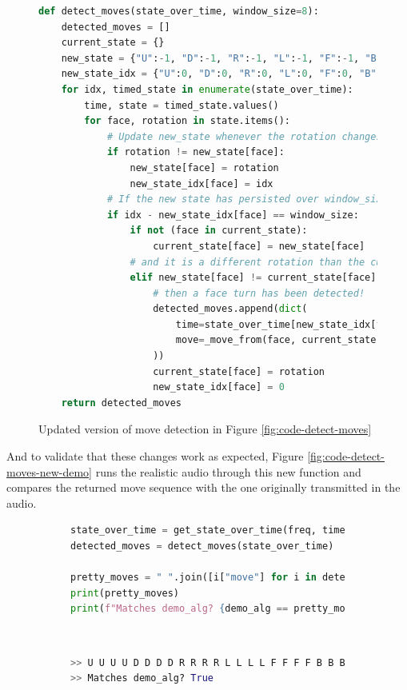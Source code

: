 \begin{figure}[h]
\caption{Updated version of move detection in Figure \ref{fig:code-detect-moves}}
\label{fig:code-detect-moves-new}
\begin{lstlisting}[language=Python, mathescape]
def detect_moves(state_over_time, window_size=8):                 # Edit
    detected_moves = []
    current_state = {}
    new_state = {"U":-1, "D":-1, "R":-1, "L":-1, "F":-1, "B":-1}  # New
    new_state_idx = {"U":0, "D":0, "R":0, "L":0, "F":0, "B":0}    # New
    for idx, timed_state in enumerate(state_over_time):
        time, state = timed_state.values()
        for face, rotation in state.items():
            # Update new_state whenever the rotation changes      # Edit $\downarrow$
            if rotation != new_state[face]:
                new_state[face] = rotation
                new_state_idx[face] = idx
            # If the new state has persisted over window_size time steps,
            if idx - new_state_idx[face] == window_size:
                if not (face in current_state):
                    current_state[face] = new_state[face]
                # and it is a different rotation than the current state,
                elif new_state[face] != current_state[face]:
                    # then a face turn has been detected!
                    detected_moves.append(dict(
                        time=state_over_time[new_state_idx[face]]["time"],
                        move=_move_from(face, current_state[face], rotation)
                    ))
                    current_state[face] = rotation
                    new_state_idx[face] = 0
    return detected_moves
\end{lstlisting}
\end{figure}

And to validate that these changes work as expected, Figure \ref{fig:code-detect-moves-new-demo} runs the realistic audio through this new  function and compares the returned move sequence with the one originally transmitted in the audio.

\begin{figure}[h]
\caption{Example: Refined move sequence extraction}
\label{fig:code-detect-moves-new-demo}
\begin{subfigure}{\textwidth}
\begin{lstlisting}[language=Python]
state_over_time = get_state_over_time(freq, time, spectrogram)
detected_moves = detect_moves(state_over_time)

pretty_moves = " ".join([i["move"] for i in detected_moves])
print(pretty_moves)   
print(f"Matches demo_alg? {demo_alg == pretty_moves}")
\end{lstlisting}
\end{subfigure}\\

\begin{subfigure}{\textwidth}
\begin{lstlisting}[language=Python, numbers=none]
>> U U U U D D D D R R R R L L L L F F F F B B B B
>> Matches demo_alg? True
\end{lstlisting}
\end{subfigure}
\end{figure}

